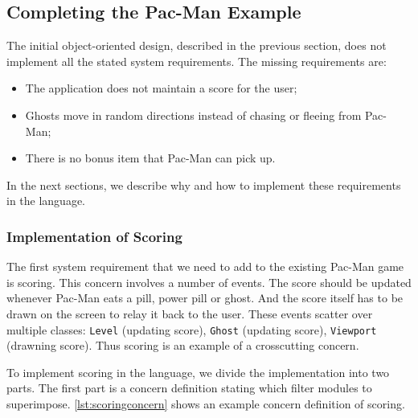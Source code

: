 \subsection{Completing the Pac-Man Example}

The initial object-oriented design, described in the previous section, does not implement all the stated system requirements.
The missing requirements are:
\begin{itemize}[noitemsep]
  \samepage
  \item The application does not maintain a score for the user;
  \item Ghosts move in random directions instead of chasing or fleeing from Pac-Man;
  \item There is no bonus item that Pac-Man can pick up.
\end{itemize}
In the next sections, we describe why and how to implement these requirements in the \Compose* language.

\subsubsection{Implementation of Scoring}

The first system requirement that we need to add to the existing Pac-Man game is scoring.
This concern involves a number of events.
The score should be updated whenever Pac-Man eats a pill, power pill or ghost.
And the score itself has to be drawn on the screen to relay it back to the user.
These events scatter over multiple classes: \lstinline|Level| (updating score), \lstinline|Ghost| (updating score), \lstinline|Viewport| (drawning score).
Thus scoring is an example of a crosscutting concern. 

To implement scoring in the \Compose* language, we divide the implementation into two parts.
The first part is a \Compose* concern definition stating which filter modules to superimpose.
\autoref{lst:scoringconcern} shows an example \Compose* concern definition of scoring.

